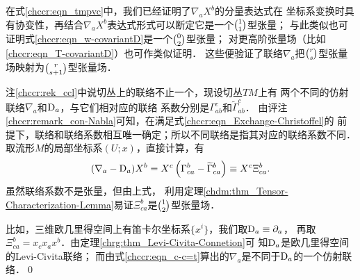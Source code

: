 在式\eqref{chccr:eqn_tmpvc}中，我们已经证明了$\nabla_a X^b$的分量表达式在
坐标系变换时具有协变性，再结合$\nabla_a X^b$表达式形式可以断定它是一个$\binom{1}{1}$型张量；
与此类似也可证明式\eqref{chccr:eqn_w-covariantD}是一个$\binom{0}{2}$型张量；
对更高阶张量场（比如\eqref{chccr:eqn_T-covariantD}）也可作类似证明．
这些便验证了联络$\nabla_a$把$\binom{r}{s}$型张量场映射为$\binom{r}{s+1}$型张量场．

\begin{example}\label{chccr:exm_c-c=t}
    注\ref{chccr:rek_ccl}中说切丛上的联络不止一个，现设切丛$TM$上有
    两个不同的仿射联络$\nabla_a$和${\rm D}_a$，与它们相对应的联络
    系数分别是$\Gamma^c_{ab}$和$\widetilde{\Gamma}^c_{ab}$．
    由评注\ref{chccr:remark_con-Nabla}可知，在满足式\eqref{chccr:eqn_Exchange-Christoffel}的
    前提下，联络和联络系数相互唯一确定；所以不同联络是指其对应的联络系数不同．
    取流形$M$的局部坐标系$(U;x)$，直接计算，有
    \begin{equation}\label{chccr:eqn_c-c=t}
        (\nabla_a-{\rm D}_a) X^b  %
        = X^c \left( \Gamma_{ca}^b - \widetilde{\Gamma}_{ca}^b \right)
        \equiv X^c \Xi_{ca}^b .
    \end{equation}
    虽然联络系数不是张量，但由上式，
    利用定理\ref{chdm:thm_Tensor-Characterization-Lemma}易证$\Xi_{ca}^b$是$\binom{1}{2}$型张量场．
    
    比如，三维欧几里得空间上有笛卡尔坐标系$\{x^i\}$，我们取${\rm D}_a \equiv \partial_a$，
    再取$\Xi_{ca}^b=x_c x_a x^b$．由定理\ref{chrg:thm_Levi-Civita-Connetion}可
    知${\rm D}_a$是欧几里得空间的Levi-Civita联络；
    而由式\eqref{chccr:eqn_c-c=t}算出的$\nabla_a$是不同于${\rm D}_a$的一个仿射联络．\qed
\end{example}



